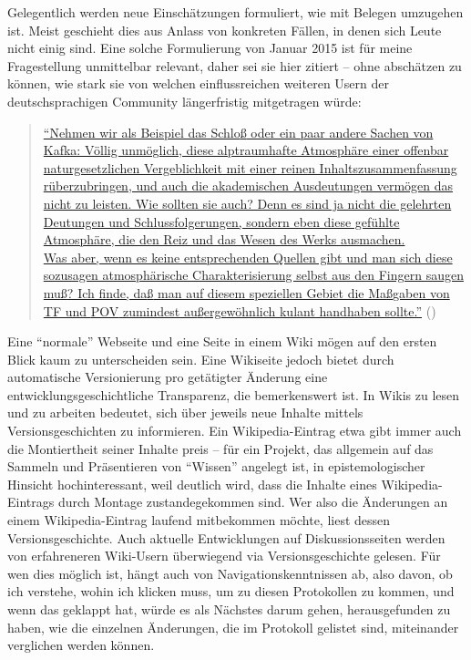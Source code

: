 \documentclass[fontsize=12pt]{scrartcl}
\begin{document}
Gelegentlich werden neue Einsch\"atzungen formuliert, wie mit Belegen umzugehen ist. Meist geschieht dies aus Anlass von konkreten F\"allen, in denen sich Leute nicht einig sind. Eine solche Formulierung von Januar 2015 ist f\"ur meine Fragestellung unmittelbar relevant, daher sei sie \mbox{hier} zitiert -- ohne absch\"atzen zu k\"onnen, wie stark sie von welchen einflussreichen weiteren Usern der deutschspra\-chi\-gen Community l\"angerfristig mitgetragen w\"urde: 

\singlespacing
\begin{quote}
\href{https://de.wikipedia.org/w/index.php?title=Benutzer_Diskussion:Grillenwaage\&diff=137961506\&oldid=137943802}{"`Nehmen wir als Beispiel das Schlo{\ss} oder ein paar andere Sachen von Kafka: V\"ollig unm\"oglich, diese alptraumhafte Atmosph\"are einer offenbar naturgesetzlichen Vergeblichkeit mit einer reinen Inhaltszusammenfassung r\"uberzubringen, und auch die akademischen Ausdeutungen verm\"o\-gen das nicht zu leisten. Wie sollten sie auch? Denn es sind ja nicht die gelehrten Deutungen und Schlussfolgerungen, sondern eben diese ge\-f\"uhlte Atmosph\"are, die den Reiz und das Wesen des Werks ausmachen.\\
Was aber, wenn es keine entsprechenden Quellen gibt und man sich diese sozusagen \flq atmosph\"arische\frq \,\,Charakterisierung \mbox{selbst} aus den Fingern saugen mu{\ss}? Ich finde, da{\ss} man auf diesem speziellen Gebiet die Ma{\ss}gaben von \href{https://de.wikipedia.org/wiki/Wikipedia:Keine_Theoriefindung}{TF} und \href{https://de.wikipedia.org/wiki/Wikipedia:Neutraler_Standpunkt}{POV} zumindest au{\ss}ergew\"ohnlich kulant handhaben sollte."'} (\cite{UserEpipactis2015b})
\end{quote}
\onehalfspacing

Eine "`normale"' Webseite und eine Seite in einem Wiki m\"ogen auf den ersten Blick kaum zu unterscheiden sein. Eine Wikiseite jedoch bietet durch automatische Versionierung pro get\"atigter \"Anderung eine entwicklungsgeschichtliche Transparenz, die bemerkenswert ist. In Wikis zu lesen und zu arbei\-ten bedeutet, sich \"uber jeweils neue Inhalte mittels Versionsgeschichten zu informieren. Ein Wi\-ki\-pe\-dia-Eintrag etwa gibt immer auch die Montiertheit seiner Inhalte preis -- f\"ur ein Projekt, das allgemein auf das Sammeln und Pr\"asentieren von "`Wissen"' angelegt ist, in epistemologischer Hinsicht hochinteressant, weil deutlich wird, dass die Inhalte eines Wi\-ki\-pe\-dia-Eintrags durch Montage zustandegekommen sind. Wer also die \"Anderungen an einem Wi\-ki\-pe\-dia-Eintrag laufend mitbekommen m\"ochte, liest dessen Versionsgeschichte. Auch aktuelle Entwicklungen auf Dis\-kus\-si\-onssei\-ten werden von erfahreneren Wiki-Usern \"uberwiegend via Versionsgeschichte gelesen. F\"ur wen dies m\"oglich ist, h\"angt auch von Navigationskenntnissen ab, also davon, ob ich verstehe, wohin ich klicken muss, um zu diesen Protokollen zu kommen, und wenn das geklappt hat, w\"urde es als N\"achstes darum gehen, he\-rausgefunden zu haben, wie die einzelnen \"Anderungen, die im Protokoll gelistet sind, miteinander verglichen werden k\"onnen. 
\end{document}
